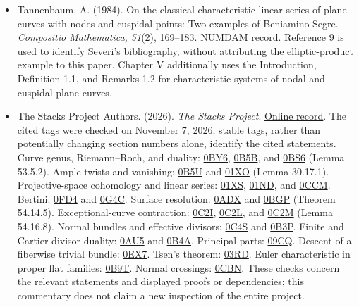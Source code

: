 \begin{sloppypar}
\begin{itemize}
\item Tannenbaum, A. (1984). On the classical characteristic linear series of plane curves with nodes and cuspidal points: Two examples of Beniamino Segre. \emph{Compositio Mathematica, 51}(2), 169--183. \href{https://www.numdam.org/item/CM_1984__51_2_169_0/}{NUMDAM record}. Reference 9 is used to identify Severi's bibliography, without attributing the elliptic-product example to this paper. Chapter V additionally uses the Introduction, Definition 1.1, and Remarks 1.2 for characteristic systems of nodal and cuspidal plane curves.

\item The Stacks Project Authors. (2026). \emph{The Stacks Project}. \href{https://stacks.math.columbia.edu/}{Online record}. The cited tags were checked on November 7, 2026; stable tags, rather than potentially changing section numbers alone, identify the cited statements. Curve genus, Riemann--Roch, and duality: \href{https://stacks.math.columbia.edu/tag/0BY6}{0BY6}, \href{https://stacks.math.columbia.edu/tag/0B5B}{0B5B}, and \href{https://stacks.math.columbia.edu/tag/0BS6}{0BS6} (Lemma 53.5.2). Ample twists and vanishing: \href{https://stacks.math.columbia.edu/tag/0B5U}{0B5U} and \href{https://stacks.math.columbia.edu/tag/01XO}{01XO} (Lemma 30.17.1). Projective-space cohomology and linear series: \href{https://stacks.math.columbia.edu/tag/01XS}{01XS}, \href{https://stacks.math.columbia.edu/tag/01ND}{01ND}, and \href{https://stacks.math.columbia.edu/tag/0CCM}{0CCM}. Bertini: \href{https://stacks.math.columbia.edu/tag/0FD4}{0FD4} and \href{https://stacks.math.columbia.edu/tag/0G4C}{0G4C}. Surface resolution: \href{https://stacks.math.columbia.edu/tag/0ADX}{0ADX} and \href{https://stacks.math.columbia.edu/tag/0BGP}{0BGP} (Theorem 54.14.5). Exceptional-curve contraction: \href{https://stacks.math.columbia.edu/tag/0C2I}{0C2I}, \href{https://stacks.math.columbia.edu/tag/0C2L}{0C2L}, and \href{https://stacks.math.columbia.edu/tag/0C2M}{0C2M} (Lemma 54.16.8). Normal bundles and effective divisors: \href{https://stacks.math.columbia.edu/tag/0C4S}{0C4S} and \href{https://stacks.math.columbia.edu/tag/0B3P}{0B3P}. Finite and Cartier-divisor duality: \href{https://stacks.math.columbia.edu/tag/0AU5}{0AU5} and \href{https://stacks.math.columbia.edu/tag/0B4A}{0B4A}. Principal parts: \href{https://stacks.math.columbia.edu/tag/09CQ}{09CQ}. Descent of a fiberwise trivial bundle: \href{https://stacks.math.columbia.edu/tag/0EX7}{0EX7}. Tsen's theorem: \href{https://stacks.math.columbia.edu/tag/03RD}{03RD}. Euler characteristic in proper flat families: \href{https://stacks.math.columbia.edu/tag/0B9T}{0B9T}. Normal crossings: \href{https://stacks.math.columbia.edu/tag/0CBN}{0CBN}. These checks concern the relevant statements and displayed proofs or dependencies; this commentary does not claim a new inspection of the entire project.


\end{itemize}
\end{sloppypar}
